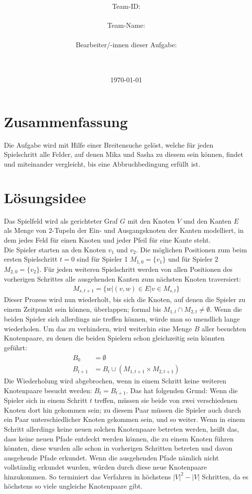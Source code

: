 \documentclass[a4paper,10pt,ngerman]{scrartcl}
\title{\textbf{\Huge\Aufgabe}}
\author{\LARGE Team-ID: \LARGE \TeamId \\\\
	    \LARGE Team-Name: \LARGE \TeamName \\\\
	    \LARGE Bearbeiter/-innen dieser Aufgabe: \\ 
	    \LARGE \Namen\\\\}
\date{\LARGE\today}
\begin{document}
\maketitle
\tableofcontents

\vspace{0.5cm}


\section{Zusammenfassung}
Die Aufgabe wird mit Hilfe einer Breitensuche gelöst, welche für jeden Spielschritt alle Felder, auf denen Mika und Sasha zu diesem sein können, findet und miteinander vergleicht, bis eine Abbruchbedingung erfüllt ist.
\section{Lösungsidee}
Das Spielfeld wird als gerichteter Graf $G$ mit den Knoten $V$ und den Kanten $E$ als Menge von 2-Tupeln der Ein- und Ausgangsknoten der Kanten modelliert, in dem jedes Feld für einen Knoten und jeder Pfeil für eine Kante steht. \\
Die Spieler starten an den Knoten $v_1$ und $v_2$. Die möglichen Positionen zum beim ersten Spielschritt $t=0$ sind für Spieler 1 $M_{1,0}=\{v_1\}$ und für Spieler 2 $M_{2,0}=\{v_2\}$. Für jeden weiteren Spielschritt werden von allen Positionen des vorherigen Schrittes alle ausgehenden Kanten zum nächsten Knoten traversiert: 
\begin{align*}
M_{s,t+1} = \{w | (v, w) \in E | v \in M_{s, t}\} 
\end{align*}
Dieser Prozess wird nun wiederholt, bis sich die Knoten, auf denen die Spieler zu einem Zeitpunkt sein können, überlappen; formal bis $M_{1, t} \cap M_{2, t} \neq \emptyset$. Wenn die beiden Spieler sich allerdings nie treffen können, würde man so unendlich lange wiederholen. Um das zu verhindern, wird weiterhin eine Menge $B$ aller besuchten Knotenpaare, zu denen die beiden Spielern schon gleichzeitig sein könnten geführt:
\begin{align*}
B_0 &= \emptyset \\
B_{t+1} &= B_{t} \cup (M_{1,t+1} \times M_{2, t+1})
\end{align*}
Die Wiederholung wird abgebrochen, wenn in einem Schritt keine weiteren Knotenpaare besucht werden: $B_t = B_{t+1}$. Das hat folgenden Grund: Wenn die Spieler sich in einem Schritt $t$ treffen, müssen sie beide von zwei verschiedenen Knoten dort hin gekommen sein; zu diesem Paar müssen die Spieler auch durch ein Paar unterschiedlicher Knoten gekommen sein, und so weiter. Wenn in einem Schritt allerdings keine neuen solchen Knotenpaare betreten werden, heißt das, dass keine neuen Pfade entdeckt werden können, die zu einem Knoten führen könnten, diese wurden alle schon in vorherigen Schritten betreten und davon ausgehende Pfade erkundet. Wenn die ausgehenden Pfade nämlich nicht vollständig erkundet wurden, würden durch diese neue Knotenpaare hinzukommen. So terminiert das Verfahren in höchstens $|V|^2 - |V|$ Schritten, da es höchstens so viele ungleiche Knotenpaare gibt. \\
\end{document}

